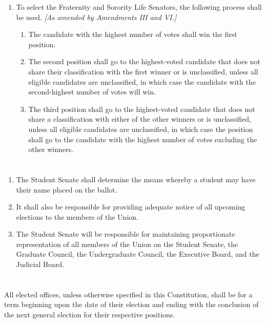 \documentclass{uniondoc}
\begin{document}
\begin{enumerate}
\begin{enumerate}
	      \end{enumerate}
	\item To select the Fraternity and Sorority Life Senators, the following process shall be used. \textit{[As amended by Amendments III and VI.]}
	      \begin{enumerate}
		      \item The candidate with the highest number of votes shall win the first position.
		      \item The second position shall go to the highest-voted candidate that does not share their classification with the first winner or is unclassified, unless all eligible candidates are unclassified, in which case the candidate with the second-highest number of votes will win.
		      \item The third position shall go to the highest-voted candidate that does not share a classification with either of the other winners or is unclassified, unless all eligible candidates are unclassified, in which case the position shall go to the candidate with the highest number of votes excluding the other winners.
	      \end{enumerate}
\end{enumerate}

\section{}

\begin{enumerate}
	\item The Student Senate shall determine the means whereby a student may have their name placed on the ballot.
	\item It shall also be responsible for providing adequate notice of all upcoming elections to the members of the Union.
	\item The Student Senate will be responsible for maintaining proportionate representation of all members of the Union on the Student Senate, the Graduate Council, the Undergraduate Council, the Executive Board, and the Judicial Board.
\end{enumerate}

\section{}

All elected offices, unless otherwise specified in this Constitution, shall be for a term beginning upon the date of their election and ending with the conclusion of the next general election for their respective positions.
\end{document}
